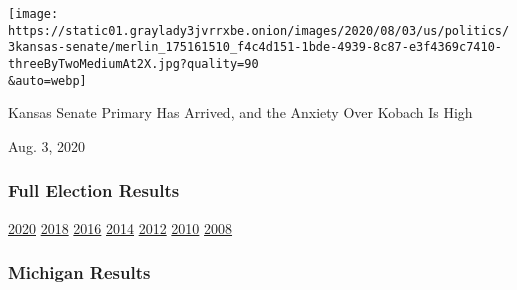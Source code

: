 \href{https://www.nytimes3xbfgragh.onion/2020/08/03/us/politics/kris-kobach-kansas-senate-primary.html?action=click\&module=ELEX_results\&pgtype=Interactive\&region=RelatedCoverage}{}

\texttt{[image: https://static01.graylady3jvrrxbe.onion/images/2020/08/03/us/politics/3kansas-senate/merlin\_175161510\_f4c4d151-1bde-4939-8c87-e3f4369c7410-threeByTwoMediumAt2X.jpg?quality=90\\\&auto=webp]}

Kansas Senate Primary Has Arrived, and the Anxiety Over Kobach Is High

Aug. 3, 2020

\hypertarget{full-election-results}{%
\subsubsection{Full Election Results}\label{full-election-results}}

\href{https://www.nytimes3xbfgragh.onion/interactive/2020/us/elections/delegate-count-primary-results.html?action=click\&module=ELEX_results\&pgtype=Interactive\&region=PastResultsFooter}{2020}
\href{https://www.nytimes3xbfgragh.onion/interactive/2018/us/elections/calendar-primary-results.html?action=click\&module=ELEX_results\&pgtype=Interactive\&region=PastResultsFooter}{2018}
\href{https://www.nytimes3xbfgragh.onion/elections/2016/results/president?action=click\&module=ELEX_results\&pgtype=Interactive\&region=PastResultsFooter}{2016}
\href{https://www.nytimes3xbfgragh.onion/elections/2014/results/senate?action=click\&module=ELEX_results\&pgtype=Interactive\&region=PastResultsFooter}{2014}
\href{https://www.nytimes3xbfgragh.onion/elections/2012/results/president.html?action=click\&module=ELEX_results\&pgtype=Interactive\&region=PastResultsFooter}{2012}
\href{https://www.nytimes3xbfgragh.onion/elections/2010/results/senate.html?action=click\&module=ELEX_results\&pgtype=Interactive\&region=PastResultsFooter}{2010}
\href{https://www.nytimes3xbfgragh.onion/elections/2008/results/president/map.html?action=click\&module=ELEX_results\&pgtype=Interactive\&region=PastResultsFooter}{2008}

\hypertarget{michigan-results}{%
\subsubsection{Michigan Results}\label{michigan-results}}

